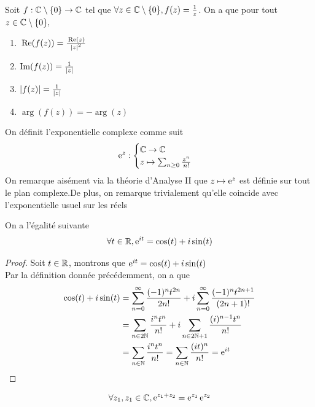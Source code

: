 \begin{exemple}
    Soit $f:\mathbb{C}\setminus\{0\}\to\mathbb{C}$ tel que $\forall z\in \mathbb{C}\setminus\{0\},f(z)=\frac{1}{z}$.
    On a que pour tout $z\in \mathbb{C}\setminus\{0\},$
    \begin{enumerate}
        \item ${\,\operatorname{Re}}(f(z))=\frac{{\,\operatorname{Re}}(z)}{\left| z \right|^2}$
        \item $\operatorname{Im}(f(z))=\frac{1}{\left| z \right|}$
        \item $\left| f(z) \right|=\frac{1}{\left| z \right|}$
        \item $\arg(f(z))=-\arg(z)$
    \end{enumerate}
\end{exemple}
\begin{definition}
    On définit l'exponentielle complexe comme suit 
    $$\operatorname{e}^z:\begin{cases}
        \mathbb{C}\to\mathbb{C}\\
        z\mapsto\sum_{n\ge0}\frac{z^n}{n!}
    \end{cases}$$
    On remarque aisément via la théorie d'Analyse II que $z\mapsto\operatorname{e}^z$ est définie sur tout le plan complexe.De plus, on remarque trivialement qu'elle coincide avec l'exponentielle usuel sur les réels
\end{definition}
\begin{theoreme}
    On a l'égalité suivante 
    $$\forall t \in \mathbb{R}, \operatorname{e}^{i t}=\cos(t)+i \sin(t)$$
\end{theoreme}
\begin{proof}
    Soit $t\in \mathbb{R}$, montrons que $\operatorname{e}^{i t}=\cos(t)+i \sin(t)$\\
    Par la définition donnée précédemment, on a que 
    \begin{align*}
        \cos(t)+i\sin(t)&=\sum_{n=0}^{\infty}\frac{(-1)^nt^{2n}}{2n!}+i \sum_{n=0}^{\infty}\frac{(-1)^nt^{2n+1}}{(2n+1)!}\\
        &=\sum_{n\in2\mathbb{N}}\frac{i^nt^n}{n!}+i\sum_{n\in2\mathbb{N}+1}\frac{(i)^{n-1}t^n}{n!}\\
        &=\sum_{n\in\mathbb{N}}\frac{i^nt^n}{n!}=\sum_{n\in\mathbb{N}}\frac{(i t)^n}{n!}=\operatorname{e}^{i t}
    \end{align*}
\end{proof}
\begin{theoreme}
    $$\forall z_1,z_1\in\mathbb{C}, \operatorname{e}^{z_1+z_2}=\operatorname{e}^{z_1}\operatorname{e}^{z_2}$$
\end{theoreme}
